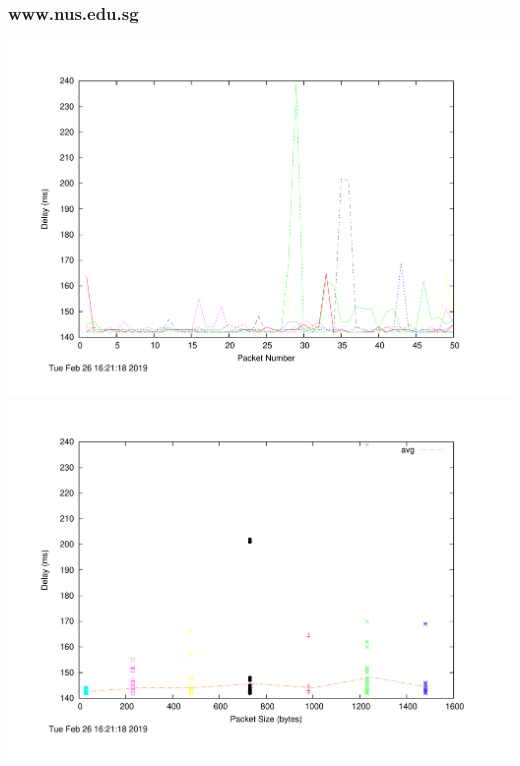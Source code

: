 \documentclass{article}
\begin{document}
\subsubsection{www.nus.edu.sg}
\includegraphics[width=\textwidth]{nus_delay.pdf}
\includegraphics[width=\textwidth]{nus_scatter.pdf}
\end{document}
